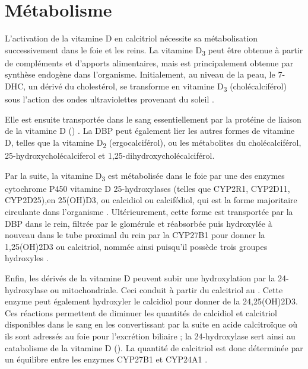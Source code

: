 \documentclass[
  a4paper,
  DIV=11,
  numbers=noendperiod,
  listof=totoc]{scrreprt}
\begin{document}
\section{Métabolisme}\label{sec-metabolisme}

L'activation de la vitamine D en calcitriol nécessite sa métabolisation
successivement dans le foie et les reins. La vitamine D\textsubscript{3}
peut être obtenue à partir de compléments et d'apports alimentaires,
mais est principalement obtenue par synthèse endogène dans l'organisme.
Initialement, au niveau de la peau, le \ac{7-DHC}, un dérivé du
cholestérol, se transforme en vitamine D\textsubscript{3}
(cholécalciférol) sous l'action des ondes ultraviolettes provenant du
soleil \autocite{Bikle.2014}.

Elle est ensuite transportée dans le sang essentiellement par la
protéine de liaison de la vitamine D ()
\autocite{Christakos.2010,Chun.2012}. La \ac{DBP} peut également lier
les autres formes de vitamine D, telles que la vitamine
D\textsubscript{2} (ergocalciférol), ou les métabolites du
cholécalciférol, 25-hydroxycholécalciferol et
1,25-dihydroxycholécalciférol.

Par la suite, la vitamine D\textsubscript{3} est métabolisée dans le
foie par une des enzymes cytochrome P450 vitamine D 25-hydroxylases
(telles que CYP2R1, CYP2D11, CYP2D25),en \ac{25(OH)D3}, ou calcidiol ou
calcifédiol, qui est la forme majoritaire circulante dans l'organisme
\autocite{Norman.2008,Christakos.2010}. Ultérieurement, cette forme est
transportée par la \ac{DBP} dans le rein, filtrée par le glomérule et
réabsorbée puis hydroxylée à nouveau dans le tube proximal du rein par
la \ac{CYP27B1} pour donner la \ac{1,25(OH)2D3} ou calcitriol, nommée
ainsi puisqu'il possède trois groupes hydroxyles
\autocite{Norman.2008,Dankers.2017}.

Enfin, les dérivés de la vitamine D peuvent subir une hydroxylation par
la 24-hydroxylase ou  mitochondriale. Ceci conduit à
partir du calcitriol au . Cette enzyme peut
également hydroxyler le calcidiol pour donner de la \ac{24,25(OH)2D3}.
Ces réactions permettent de diminuer les quantités de calcidiol et
calcitriol disponibles dans le sang en les convertissant par la suite en
acide calcitroïque où ils sont adressés au foie pour l'excrétion
biliaire \autocite{Prosser.2004} ; la 24-hydroxylase sert ainsi au
catabolisme de la vitamine D \autocite{Norman.2008}
(). La quantité de calcitriol est donc
déterminée par un équilibre entre les enzymes \ac{CYP27B1} et
\ac{CYP24A1} \autocite{Dankers.2017}.
\end{document}
